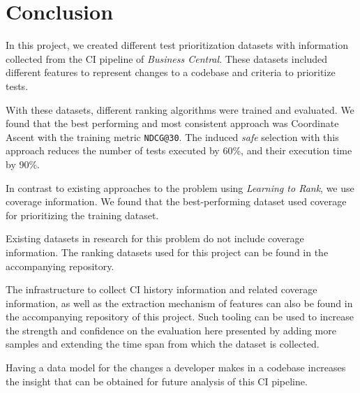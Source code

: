 \chapter{Conclusion}

In this project, we created different test prioritization datasets with 
information collected from the CI pipeline of \emph{Business Central}. These datasets included
different features to represent changes to a codebase and criteria to prioritize tests.

With these datasets, different ranking algorithms were trained and evaluated. We
found that the best performing and most consistent approach was Coordinate Ascent
with the training metric \texttt{NDCG@30}. The induced \emph{safe} selection with
this approach reduces the number of tests executed by 60\%, and their execution time 
by 90\%.

In contrast to existing approaches to the problem using \emph{Learning to Rank},
we use coverage information. We found that the best-performing dataset
used coverage for prioritizing the training dataset. 

Existing datasets in research for this problem do not include 
coverage information. The ranking datasets used for this project 
can be found in the accompanying repository. 

The infrastructure to collect CI history information and related coverage information,
as well as the extraction mechanism of features can also be found in the accompanying 
repository of this project. Such tooling can be used to increase the strength and confidence on the 
evaluation here presented by adding more samples and extending 
the time span from which the dataset is collected. 

Having a data model for the changes a developer makes in a codebase increases
the insight that can be obtained for future analysis of this CI pipeline.

%